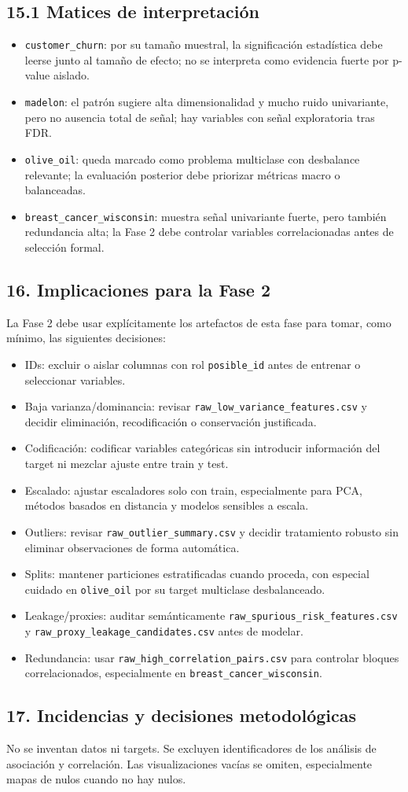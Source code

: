 \subsection{15.1 Matices de interpretación}
\begin{itemize}
\item \texttt{customer\_churn}: por su tamaño muestral, la significación estadística debe leerse junto al tamaño de efecto; no se interpreta como evidencia fuerte por p-value aislado.
\item \texttt{madelon}: el patrón sugiere alta dimensionalidad y mucho ruido univariante, pero no ausencia total de señal; hay variables con señal exploratoria tras FDR.
\item \texttt{olive\_oil}: queda marcado como problema multiclase con desbalance relevante; la evaluación posterior debe priorizar métricas macro o balanceadas.
\item \texttt{breast\_cancer\_wisconsin}: muestra señal univariante fuerte, pero también redundancia alta; la Fase 2 debe controlar variables correlacionadas antes de selección formal.
\end{itemize}

\subsection{16. Implicaciones para la Fase 2}
La Fase 2 debe usar explícitamente los artefactos de esta fase para tomar, como mínimo, las siguientes decisiones:
\begin{itemize}
\item IDs: excluir o aislar columnas con rol \texttt{posible\_id} antes de entrenar o seleccionar variables.
\item Baja varianza/dominancia: revisar \texttt{raw\_low\_variance\_features.csv} y decidir eliminación, recodificación o conservación justificada.
\item Codificación: codificar variables categóricas sin introducir información del target ni mezclar ajuste entre train y test.
\item Escalado: ajustar escaladores solo con train, especialmente para PCA, métodos basados en distancia y modelos sensibles a escala.
\item Outliers: revisar \texttt{raw\_outlier\_summary.csv} y decidir tratamiento robusto sin eliminar observaciones de forma automática.
\item Splits: mantener particiones estratificadas cuando proceda, con especial cuidado en \texttt{olive\_oil} por su target multiclase desbalanceado.
\item Leakage/proxies: auditar semánticamente \texttt{raw\_spurious\_risk\_features.csv} y \texttt{raw\_proxy\_leakage\_candidates.csv} antes de modelar.
\item Redundancia: usar \texttt{raw\_high\_correlation\_pairs.csv} para controlar bloques correlacionados, especialmente en \texttt{breast\_cancer\_wisconsin}.
\end{itemize}

\subsection{17. Incidencias y decisiones metodológicas}
No se inventan datos ni targets. Se excluyen identificadores de los análisis de asociación y correlación. Las visualizaciones vacías se omiten, especialmente mapas de nulos cuando no hay nulos.